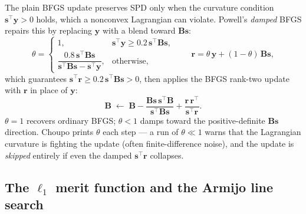 \documentclass[11pt,a4paper]{article}
\newcommand{\Bv}{\mathbf{B}}                          %
\begin{document}
The plain BFGS update preserves SPD only when the curvature condition
$\mathbf s^{\!\top}\mathbf y > 0$ holds, which a nonconvex Lagrangian can
violate. Powell's \emph{damped} BFGS \cite{Powell1978} repairs this by
replacing $\mathbf y$ with a blend toward $\Bv\mathbf s$:
\begin{equation}
   \theta =
   \begin{cases}
     1, & \mathbf s^{\!\top}\mathbf y \ge 0.2\, \mathbf s^{\!\top}\Bv\mathbf s, \\[4pt]
     \dfrac{0.8\, \mathbf s^{\!\top}\Bv\mathbf s}
           {\mathbf s^{\!\top}\Bv\mathbf s - \mathbf s^{\!\top}\mathbf y},
     & \text{otherwise},
   \end{cases}
   \qquad
   \mathbf r = \theta\, \mathbf y + (1 - \theta)\, \Bv\mathbf s,
   \label{eq:powell-theta}
\end{equation}
which guarantees $\mathbf s^{\!\top}\mathbf r \ge 0.2\,
\mathbf s^{\!\top}\Bv\mathbf s > 0$, then applies the BFGS rank-two
update with $\mathbf r$ in place of $\mathbf y$:
\begin{equation}
   \Bv \;\leftarrow\;
     \Bv
     - \frac{\Bv\mathbf s\, \mathbf s^{\!\top}\Bv}
            {\mathbf s^{\!\top}\Bv\mathbf s}
     + \frac{\mathbf r\, \mathbf r^{\!\top}}
            {\mathbf s^{\!\top}\mathbf r}.
   \label{eq:bfgs-update}
\end{equation}
$\theta = 1$ recovers ordinary BFGS; $\theta < 1$ damps toward the
positive-definite $\Bv\mathbf s$ direction. Choupo prints $\theta$ each
step --- a run of $\theta \ll 1$ warns that the Lagrangian curvature is
fighting the update (often finite-difference noise), and the update is
\emph{skipped} entirely if even the damped $\mathbf s^{\!\top}\mathbf r$
collapses.

\subsection{The $\ell_1$ merit function and the Armijo line search}
\end{document}
